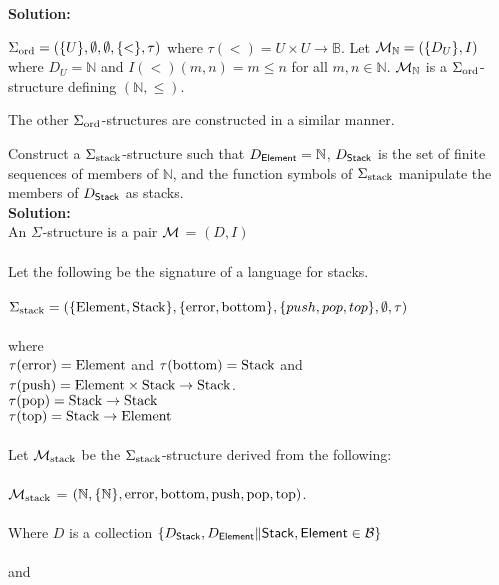 \documentclass[11pt,fleqn]{article}
\newcommand{\sB}{\mbox{$\cal B$}}
\newcommand{\sM}{\mbox{$\cal M$}}
\newcommand{\set}[1]{{\{ #1 \}}}
\begin{document}
\medskip

\textbf {Solution:}

$\Sigma_{\rm ord} = (\set{U},\emptyset,\emptyset,\set{<},\tau)$ where
$\tau(<) = U \times U \rightarrow \mathbb{B}$.  Let $\sM_{\mathbb{N}}
= (\set{D_U},I)$ where $D_U = \mathbb{N}$ and $I(<)(m,n) = m \le n$
for all $m,n \in \mathbb{N}$.  $\sM_{\mathbb{N}}$ is a $\Sigma_{\rm
  ord}$-structure defining $(\mathbb{N},\le)$.

The other $\Sigma_{\rm ord}$-structures are constructed in a similar
manner.

\item Construct a $\Sigma_{\rm stack}$-structure such that $D_{\sf Element} = \mathbb{N}$, $D_{\sf Stack}$ is the set of finite sequences of members of $\mathbb{N}$, and the function symbols of $\Sigma_{\rm stack}$ manipulate the members of $D_{\sf Stack}$ as stacks.\\
\textbf {Solution:}\\
An  $\Sigma_{}$-structure is a pair $\sM_{}$ = $(D, I)$ \\
\\
Let the following be the signature of a language for stacks. \\
\\
$\Sigma_{\rm stack} =
  (\set{\rm Element,Stack},\set{\rm error,\rm bottom},\set{push,pop,top},\emptyset,\tau)$ \\
\\ where \\ $\tau(\rm error) =
  \rm Element$ and $\tau(\rm bottom) =
  \rm Stack$ and \\ $\tau(\rm push) = \rm Element \times \rm Stack \rightarrow \rm Stack$. \\  $\tau(\rm pop) = \rm Stack \rightarrow \rm Stack$
\\
$\tau(\rm top) = \rm Stack \rightarrow \rm Element$ \\
\\
Let $\sM_{\rm stack}$ be the $\Sigma_{\rm stack}$-structure derived from the following: \\
\\
$\sM_{\rm stack}$ = $(\mathbb{N},\{\mathbb{N}\},\rm error, \rm bottom, \rm push, \rm pop,\rm  top)$.
\\
\\
Where $D$ is a collection $\{D_{\sf Stack},D_{\sf Element}\| \sf Stack, \sf Element \in \sB\}$\\
\\
and
\\
\\
\end{document}
